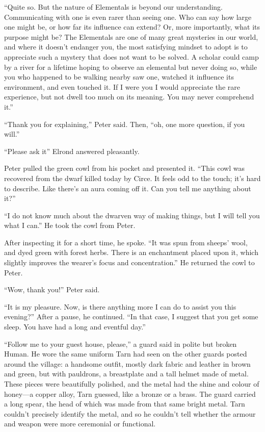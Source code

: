 ``Quite so.  But the nature of Elementals is beyond our understanding.  Communicating with one is even rarer than seeing one.  Who can say how large one might be, or how far its influence can extend?  Or, more importantly, what its purpose might be?  The Elementals are one of many great mysteries in our world, and where it doesn't endanger you, the most satisfying mindset to adopt is to appreciate such a mystery that does not want to be solved.  A scholar could camp by a river for a lifetime hoping to observe an elemental but never doing so, while you who happened to be walking nearby saw one, watched it influence its environment, and even touched it.  If I were you I would appreciate the rare experience, but not dwell too much on its meaning.  You may never comprehend it.''

``Thank you for explaining,'' Peter said.  Then, ``oh, one more question, if you will.''

``Please ask it'' Elrond answered pleasantly.

Peter pulled the green cowl from his pocket and presented it.  ``This cowl was recovered from the dwarf killed today by Circe.  It feels odd to the touch; it's hard to describe.  Like there's an aura coming off it.  Can you tell me anything about it?''

``I do not know much about the dwarven way of making things, but I will tell you what I can.''  He took the cowl from Peter.

After inspecting it for a short time, he spoke.  ``It was spun from sheeps' wool, and dyed green with forest herbs.  There is an enchantment placed upon it, which slightly improves the wearer's focus and concentration.''  He returned the cowl to Peter.

``Wow, thank you!'' Peter said.

``It is my pleasure.  Now, is there anything more I can do to assist you this evening?''  After a pause, he continued.  ``In that case, I suggest that you get some sleep.  You have had a long and eventful day.''

``Follow me to your guest house, please,'' a guard said in polite but broken Human.  He wore the same uniform Tarn had seen on the other guards posted around the village: a handsome outfit, mostly dark fabric and leather in brown and green, but with pauldrons, a breastplate and a tall helmet made of metal.  These pieces were beautifully polished, and the metal had the shine and colour of honey---a copper alloy, Tarn guessed, like a bronze or a brass.  The guard carried a long spear, the head of which was made from that same bright metal.  Tarn couldn't precisely identify the metal, and so he couldn't tell whether the armour and weapon were more ceremonial or functional.

